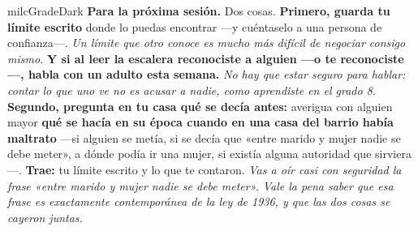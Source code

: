 \documentclass[11pt,letterpaper]{article}
\begin{document}
\begin{infoband}{milcGradeDark}
\textbf{Para la próxima sesión.} Dos cosas. \textbf{Primero, guarda tu límite escrito} donde lo puedas encontrar ---y cuéntaselo a una persona de confianza---. \emph{Un límite que otro conoce es mucho más difícil de negociar consigo mismo.} \textbf{Y si al leer la escalera reconociste a alguien ---o te reconociste---, habla con un adulto esta semana.} \emph{No hay que estar seguro para hablar: contar lo que uno ve no es acusar a nadie, como aprendiste en el grado 8.} \textbf{Segundo, pregunta en tu casa qué se decía antes:} averigua con alguien mayor \textbf{qué se hacía en su época cuando en una casa del barrio había maltrato} ---si alguien se metía, si se decía que «entre marido y mujer nadie se debe meter», a dónde podía ir una mujer, si existía alguna autoridad que sirviera---. \textbf{Trae:} tu límite escrito y lo que te contaron. \emph{Vas a oír casi con seguridad la frase «entre marido y mujer nadie se debe meter». Vale la pena saber que esa frase es exactamente contemporánea de la ley de 1936, y que las dos cosas se cayeron juntas.}
\end{infoband}
\end{document}
